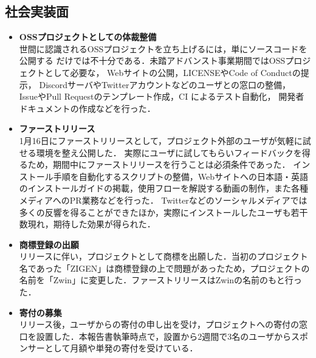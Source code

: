 \subsection{社会実装面}

\begin{itemize}
      \item \textbf{OSSプロジェクトとしての体裁整備} \\
            世間に認識されるOSSプロジェクトを立ち上げるには，単にソースコードを公開する
            だけでは不十分である．未踏アドバンスト事業期間ではOSSプロジェクトとして必要な，
            Webサイトの公開，LICENSEやCode of Conductの提示，
            DiscordサーバやTwitterアカウントなどのユーザとの窓口の整備，
            IssueやPull Requestのテンプレート作成，CI によるテスト自動化，
            開発者ドキュメントの作成などを行った．
      \item \textbf{ファーストリリース} \\
            1月16日にファーストリリースとして，プロジェクト外部のユーザが気軽に試せる環境を整え公開した．
            実際にユーザに試してもらいフィードバックを得るため，期間中にファーストリリースを行うことは必須条件であった．
            インストール手順を自動化するスクリプトの整備，Webサイトへの日本語・英語のインストールガイドの掲載，使用フローを解説する動画の制作，また各種メディアへのPR業務などを行った．
            Twitterなどのソーシャルメディアでは多くの反響を得ることができたほか，実際にインストールしたユーザも若干数現れ，期待した効果が得られた．
      \item \textbf{商標登録の出願} \\
            リリースに伴い，プロジェクトとして商標を出願した．当初のプロジェクト名であった「ZIGEN」は商標登録の上で問題があったため，プロジェクトの名前を「Zwin」に変更した．ファーストリリースはZwinの名前のもと行った．
      \item \textbf{寄付の募集} \\
            リリース後，ユーザからの寄付の申し出を受け，プロジェクトへの寄付の窓口を設置した．本報告書執筆時点で，設置から2週間で3名のユーザからスポンサーとして月額や単発の寄付を受けている．
\end{itemize}
